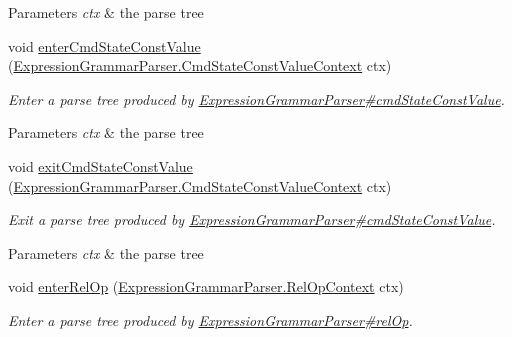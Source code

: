 \begin{DoxyCompactItemize}
\begin{DoxyCompactList}
\begin{DoxyParams}{Parameters}
{\em ctx} & the parse tree\\
\hline
\end{DoxyParams}
 \end{DoxyCompactList}\item 
void \hyperlink{classgov_1_1nasa_1_1jpf_1_1inspector_1_1server_1_1expression_1_1parser_1_1_expression_grammar_base_listener_a73b2021ffd58c794c99e422934474ff2}{enter\+Cmd\+State\+Const\+Value} (\hyperlink{classgov_1_1nasa_1_1jpf_1_1inspector_1_1server_1_1expression_1_1parser_1_1_expression_grammar_pa618023edddc6cf63ca4452111d0560c6}{Expression\+Grammar\+Parser.\+Cmd\+State\+Const\+Value\+Context} ctx)
\begin{DoxyCompactList}\small\item\em Enter a parse tree produced by \hyperlink{classgov_1_1nasa_1_1jpf_1_1inspector_1_1server_1_1expression_1_1parser_1_1_expression_grammar_parser_a86b5c0db5219832726e50e8e4b168ac2}{Expression\+Grammar\+Parser\#cmd\+State\+Const\+Value}.


\begin{DoxyParams}{Parameters}
{\em ctx} & the parse tree\\
\hline
\end{DoxyParams}
 \end{DoxyCompactList}\item 
void \hyperlink{classgov_1_1nasa_1_1jpf_1_1inspector_1_1server_1_1expression_1_1parser_1_1_expression_grammar_base_listener_a890d7b6552a26fcdf56fc4e74b9547ce}{exit\+Cmd\+State\+Const\+Value} (\hyperlink{classgov_1_1nasa_1_1jpf_1_1inspector_1_1server_1_1expression_1_1parser_1_1_expression_grammar_pa618023edddc6cf63ca4452111d0560c6}{Expression\+Grammar\+Parser.\+Cmd\+State\+Const\+Value\+Context} ctx)
\begin{DoxyCompactList}\small\item\em Exit a parse tree produced by \hyperlink{classgov_1_1nasa_1_1jpf_1_1inspector_1_1server_1_1expression_1_1parser_1_1_expression_grammar_parser_a86b5c0db5219832726e50e8e4b168ac2}{Expression\+Grammar\+Parser\#cmd\+State\+Const\+Value}.


\begin{DoxyParams}{Parameters}
{\em ctx} & the parse tree\\
\hline
\end{DoxyParams}
 \end{DoxyCompactList}\item 
void \hyperlink{classgov_1_1nasa_1_1jpf_1_1inspector_1_1server_1_1expression_1_1parser_1_1_expression_grammar_base_listener_a83fd11740e9249e1211f2beaf3669e04}{enter\+Rel\+Op} (\hyperlink{classgov_1_1nasa_1_1jpf_1_1inspector_1_1server_1_1expression_1_1parser_1_1_expression_grammar_parser_1_1_rel_op_context}{Expression\+Grammar\+Parser.\+Rel\+Op\+Context} ctx)
\begin{DoxyCompactList}\small\item\em Enter a parse tree produced by \hyperlink{classgov_1_1nasa_1_1jpf_1_1inspector_1_1server_1_1expression_1_1parser_1_1_expression_grammar_parser_af76d7c4bc312c622f71db248bbfd8f7e}{Expression\+Grammar\+Parser\#rel\+Op}.



\end{DoxyCompactList}
\end{DoxyCompactItemize}
